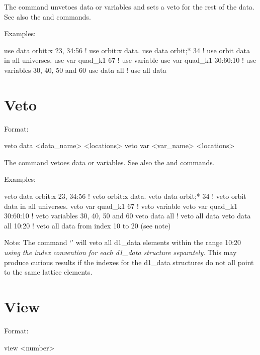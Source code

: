 {{\vskip 0.2in 
The  command unvetoes data or variables and sets a veto for
the rest of the data. See also the  and 
commands.

Examples:
\begin{example}
  use data orbit:x  23, 34:56  ! use orbit:x data.
  use data orbit;* 34          ! use orbit data in all universes.
  use var quad_k1 67           ! use variable
  use var quad_k1 30:60:10     ! use variables 30, 40, 50 and 60
  use data all                 ! use all data
\end{example}


\section{Veto}
\label{s:veto}

Format:
\begin{example}
  veto data <data_name> <locations>
  veto var <var_name> <locations>
\end{example}

\vskip 0.2in 
The  command vetoes data or variables. See also the
 and  commands.

Examples:
\begin{example}
  veto data orbit:x  23, 34:56 ! veto orbit:x data.
  veto data orbit;* 34         ! veto orbit data in all universes.
  veto var quad_k1 67          ! veto variable
  veto var quad_k1 30:60:10    ! veto variables 30, 40, 50 and 60
  veto data all                ! veto all data
  veto data all 10:20          ! veto all data from index 10 to 20 (see note)
\end{example}

Note: The command `' will veto all d1\_data elements
within the range 10:20 \textit{using the index convention for each d1\_data
structure separately}. This may produce curious results if the
indexes for the d1\_data structures do not all point to the same lattice
elements. 

\section{View}
\label{s:view}

Format:
\begin{example}
  view <number>
\end{example}

}}
